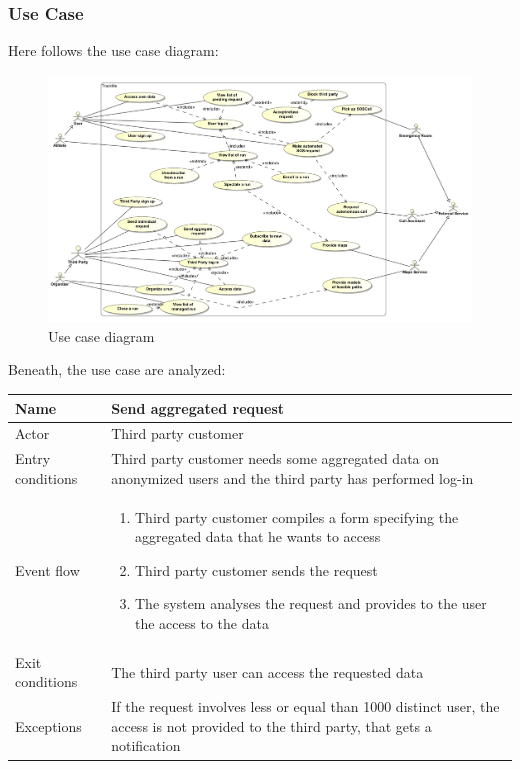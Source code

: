 \subsubsection{Use Case}
Here follows the use case diagram: \\

\begin{figure}[H]
\includegraphics[width=\linewidth]{Images/usecase}
\caption{Use case diagram}
\label{fig:usecasediagram}
\end{figure}

\par 
Beneath, the use case are analyzed:	\\

\begin{table}[H]
\begin{tabularx}{\textwidth}{|l|X|}
\hline
 Name & Send aggregated request \\ \hline
 Actor & Third party customer  \\ \hline
 Entry conditions & Third party customer needs some aggregated data on anonymized users and the third party has performed log-in \\ \hline
 Event flow & 
 \begin{enumerate}
 	\item Third party customer compiles a form specifying the aggregated data that he wants to access
 	\item Third party customer sends the request
 	\item The system analyses the request and provides to the user the access to the data 
 \end{enumerate}   \\ \hline
 Exit conditions & The third party user can access the requested data \\ \hline
 Exceptions & If the request involves less or equal than 1000 distinct user, the access is not provided to the third party, that gets a notification \\ \hline
\end{tabularx}
\end{table}

